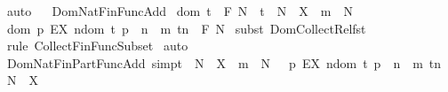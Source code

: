 \begin{isabellebody}
\isamarkupfalse%
\ auto\isanewline
{}\isamarkupfalse%
%
\endisatagproof
{\isafoldproof}%
%
\isadelimproof
%
\endisadelimproof
\ \isanewline
\isanewline
\isanewline
{}\isamarkupfalse%
\ Dom{\isacharunderscore}Nat{\isacharunderscore}Fin{\isacharunderscore}Func{\isacharunderscore}Add{\isacharcolon}\ \isanewline
{\isachardoublequoteopen}{\isacharbrackleft}{\isacharbar}dom\ t\ {\isacharcolon}\ {\isacharpercent}F\ {\isacharpercent}N\ {\isacharsemicolon}\ t\ {\isacharcolon}\ {\isacharparenleft}{\isacharpercent}N\ {\isacharminus}{\isacharbar}{\isacharminus}{\isachargreater}\ X{\isacharparenright}\ {\isacharsemicolon}\ m\ {\isacharcolon}\ {\isacharpercent}N{\isacharbar}{\isacharbrackright}\ {\isacharequal}{\isacharequal}{\isachargreater}\ \ \isanewline
\ dom\ {\isacharbraceleft}p{\isachardot}\ EX\ n{\isacharcolon}dom\ t{\isachardot}\ p\ {\isacharequal}\ {\isacharparenleft}n\ {\isacharplus}\ m{\isacharcomma}\ t{\isacharpercent}{\isacharcircum}n{\isacharparenright}{\isacharbraceright}\ {\isacharcolon}\ {\isacharpercent}F\ {\isacharpercent}N{\isachardoublequoteclose}\isanewline
%
\isadelimproof
%
\endisadelimproof
%
\isatagproof
{}\isamarkupfalse%
\ {\isacharparenleft}subst\ Dom{\isacharunderscore}Collect{\isacharunderscore}Rel{\isacharunderscore}fst{\isacharparenright}\isanewline
{}\isamarkupfalse%
\ {\isacharparenleft}rule\ Collect{\isacharunderscore}Fin{\isacharunderscore}Func{\isacharunderscore}Subset{\isacharparenright}\isanewline
{}\isamarkupfalse%
\ auto\isanewline
{}\isamarkupfalse%
%
\endisatagproof
{\isafoldproof}%
%
\isadelimproof
\isanewline
%
\endisadelimproof
\isanewline
{}\isamarkupfalse%
\ Dom{\isacharunderscore}Nat{\isacharunderscore}Fin{\isacharunderscore}Part{\isacharunderscore}Func{\isacharunderscore}Add\ {\isacharbrackleft}simp{\isacharbrackright}{\isacharcolon}{\isachardoublequoteopen}{\isacharbrackleft}{\isacharbar}t\ {\isacharcolon}\ {\isacharparenleft}{\isacharpercent}N\ {\isacharminus}{\isacharbar}{\isacharbar}{\isacharminus}{\isachargreater}\ X{\isacharparenright}\ {\isacharsemicolon}\ m\ {\isacharcolon}\ {\isacharpercent}N{\isacharbar}{\isacharbrackright}\ {\isacharequal}{\isacharequal}{\isachargreater}\ \ {\isacharbraceleft}p{\isachardot}\ EX\ n{\isacharcolon}dom\ t{\isachardot}\ p\ {\isacharequal}\ {\isacharparenleft}n\ {\isacharplus}\ m{\isacharcomma}\ t{\isacharpercent}{\isacharcircum}n{\isacharparenright}{\isacharbraceright}\ {\isacharcolon}\ {\isacharparenleft}{\isacharpercent}N\ {\isacharminus}{\isacharbar}{\isacharbar}{\isacharminus}{\isachargreater}\ X{\isacharparenright}{\isachardoublequoteclose}\isanewline

\end{isabellebody}
